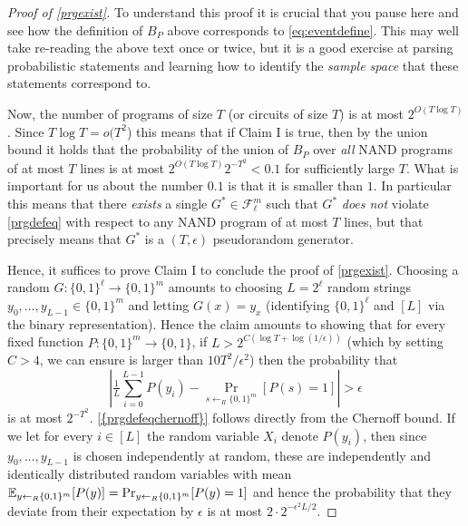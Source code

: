 \begin{proof}[Proof of \cref{prgexist}]
To understand this proof it is crucial that you pause here and see how
the definition of \(B_P\) above corresponds to \eqref{eq:eventdefine}.
This may well take re-reading the above text once or twice, but it is a
good exercise at parsing probabilistic statements and learning how to
identify the \emph{sample space} that these statements correspond to.

Now, the number of programs of size \(T\) (or circuits of size \(T\)) is
at most \(2^{O(T\log T)}\). Since \(T\log T = o(T^2\)) this means that
if Claim I is true, then by the union bound it holds that the
probability of the union of \(B_P\) over \emph{all} NAND programs of at
most \(T\) lines is at most \(2^{O(T\log T)}2^{-T^2} < 0.1\) for
sufficiently large \(T\). What is important for us about the number
\(0.1\) is that it is smaller than \(1\). In particular this means that
there \emph{exists} a single \(G^* \in \mathcal{F}_\ell^m\) such that
\(G^*\) \emph{does not} violate \eqref{prgdefeq} with respect to any
NAND program of at most \(T\) lines, but that precisely means that
\(G^*\) is a \((T,\epsilon)\) pseudorandom generator.

Hence, it suffices to prove Claim I to conclude the proof of
\cref{prgexist}. Choosing a random
\(G: \{0,1\}^\ell \rightarrow \{0,1\}^m\) amounts to choosing
\(L=2^\ell\) random strings \(y_0,\ldots,y_{L-1} \in \{0,1\}^m\) and
letting \(G(x)=y_x\) (identifying \(\{0,1\}^\ell\) and \([L]\) via the
binary representation). Hence the claim amounts to showing that for
every fixed function \(P:\{0,1\}^m \rightarrow \{0,1\}\), if
\(L > 2^{C (\log T + \log (1/\epsilon))}\) (which by setting \(C>4\), we
can ensure is larger than \(10 T^2/\epsilon^2\)) then the probability
that \[
\left| \tfrac{1}{L}\sum_{i=0}^{L-1} P(y_i) - \Pr_{s \leftarrow_R \{0,1\}^m}[P(s)=1] \right| > \epsilon \label{prgdefeqchernoff}
\] is at most \(2^{-T^2}\). \eqref{{prgdefeqchernoff}} follows directly
from the Chernoff bound. If we let for every \(i\in [L]\) the random
variable \(X_i\) denote \(P(y_i)\), then since \(y_0,\ldots,y_{L-1}\) is
chosen independently at random, these are independently and identically
distributed random variables with mean
\(\operatorname*{\mathbb E}_{y \leftarrow_R \{0,1\}^m}[P(y)]= \Pr_{y\leftarrow_R \{0,1\}^m}[ P(y)=1]\)
and hence the probability that they deviate from their expectation by
\(\epsilon\) is at most \(2\cdot 2^{-\epsilon^2 L/2}\).

\end{proof}
